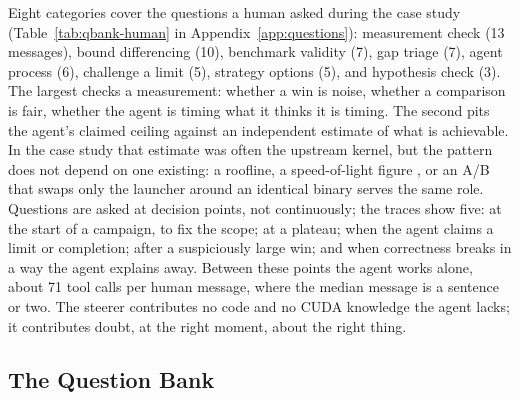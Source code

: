 Eight categories cover the questions a human asked during the case study
(Table~\ref{tab:qbank-human} in Appendix~\ref{app:questions}): measurement check (13 messages), bound
differencing (10), benchmark validity (7), gap triage (7), agent process (6), challenge a limit (5),
strategy options (5), and hypothesis check (3). The largest checks a measurement: whether a win is noise, whether a comparison is fair, whether the
agent is timing what it thinks it is timing. The second pits the agent's claimed ceiling against an
independent estimate of what is achievable. In the case study that estimate was often the upstream
kernel, but the pattern does not depend on one existing: a roofline, a speed-of-light figure
\cite{lin2026solexecbench}, or an A/B that swaps only the launcher around an identical binary serves
the same role. Questions are asked at
decision points, not continuously; the traces show five: at the start of a campaign, to fix the
scope; at a plateau; when the agent claims a limit or completion; after a suspiciously large win;
and when correctness breaks in a way the agent explains away. Between these points the agent works
alone, about 71 tool calls per human message, where the median message is a sentence or two. The
steerer contributes no code and no CUDA knowledge the agent lacks; it contributes doubt, at the right
moment, about the right thing.

\subsection{The Question Bank}
\label{sec:workflow-bank}

